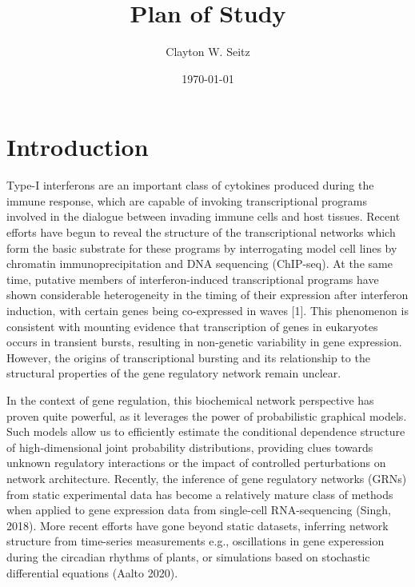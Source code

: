 \documentclass{article}
\title{Plan of Study}
\author{Clayton W. Seitz}
\date{\today}
\begin{document}
  \maketitle%
\vspace{0.4in}

\begin{abstract}
\end{abstract}

\section{Introduction}

Type-I interferons are an important class of cytokines produced during the immune response, which are capable of invoking transcriptional programs involved in the dialogue between invading immune cells and host tissues. Recent efforts have begun to reveal the structure of the transcriptional networks which form the basic substrate for these programs by interrogating model cell lines by chromatin immunoprecipitation and DNA sequencing (ChIP-seq). At the same time, putative members of interferon-induced transcriptional programs have shown considerable heterogeneity in the timing of their expression after interferon induction, with certain genes being co-expressed in waves [1]. This phenomenon is consistent with mounting evidence that transcription of genes in eukaryotes occurs in transient bursts, resulting in non-genetic variability in gene expression. However, the origins of transcriptional bursting and its relationship to the structural properties of the gene regulatory network remain unclear.

In the context of gene regulation, this biochemical network perspective has proven quite powerful, as it leverages the power of probabilistic graphical models. Such models allow us to efficiently estimate the conditional dependence structure of high-dimensional joint probability distributions, providing clues towards unknown regulatory interactions or the impact of controlled perturbations on network architecture. Recently, the inference of gene regulatory networks (GRNs) from static experimental data has become a relatively mature class of methods when applied to gene expression data from single-cell RNA-sequencing (Singh, 2018). More recent efforts have gone beyond static datasets, inferring network structure from time-series measurements e.g., oscillations in gene experession during the circadian rhythms of plants, or simulations based on stochastic differential equations (Aalto 2020). 
\end{document}

